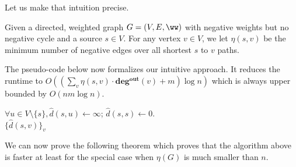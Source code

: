 Let us make that intuition precise.

\begin{definition}
Given a directed, weighted graph $G=(V,E,\ww)$ with negative weights but no negative cycle and a source $s \in V$. For any vertex $v \in V$, we let $\eta(s,v)$ be the minimum number of negative edges over all shortest $s$ to $v$ paths. 
\end{definition}

The pseudo-code below now formalizes our intuitive approach. It reduces the runtime to $O((\sum_v \eta(s,v) \cdot \mathbf{deg^{out}}(v) + m) \log n)$ which is always upper bounded by $O(nm \log n)$.

\begin{algorithm}
$\forall u \in V \setminus \{s\}, \hat{d}(s, u) \gets \infty$; $\hat{d}(s,s) \gets 0$.\\
\Return $\{\hat{d}(s, v) \}_v$
\caption{$\textsc{HeuristicBellmanFord}(G,s)$}
\label{alg:embellishedBellmanFord}
\end{algorithm}

We can now prove the following theorem which proves that the algorithm above is faster at least for the special case when $\eta(G)$ is much smaller than $n$.


